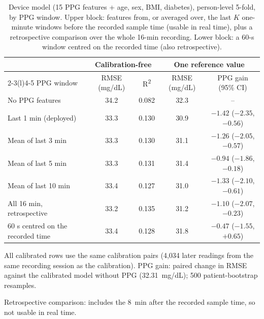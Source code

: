 \documentclass[11pt]{article}
\newcommand{\RR}{R\textsuperscript{2}}
\newcommand{\mgdl}{mg/dL}
\begin{document}
\begin{table}[!htbp]
\centering\footnotesize\setlength{\tabcolsep}{3.2pt}
\begin{threeparttable}
\caption{Device model (15 PPG features + age, sex, BMI, diabetes), person-level 5-fold, by PPG window. Upper block: features from, or averaged over, the last $K$ one-minute windows before the recorded sample time (usable in real time), plus a retrospective comparison over the whole 16-min recording. Lower block: a 60-s window centred on the recorded time (also retrospective).}
\label{tab:device}
\begin{tabular}{@{}lcccc@{}}
\toprule
& \multicolumn{2}{c}{Calibration-free} & \multicolumn{2}{c}{One reference value} \\
\cmidrule(lr){2-3}\cmidrule(l){4-5}
PPG window & RMSE (\mgdl{}) & \RR{} & RMSE (\mgdl{}) & PPG gain (95\% CI) \\
\midrule
No PPG features & 34.2 & 0.082 & 32.3 & -- \\
\rowcolor{rowgray} Last 1 min (deployed) & 33.3 & 0.130 & 30.9 & $-1.42$ ($-2.35$, $-0.56$) \\
Mean of last 3 min & 33.3 & 0.130 & 31.1 & $-1.26$ ($-2.05$, $-0.57$) \\
Mean of last 5 min & 33.3 & 0.131 & 31.4 & $-0.94$ ($-1.86$, $-0.18$) \\
Mean of last 10 min & 33.4 & 0.127 & 31.0 & $-1.33$ ($-2.10$, $-0.61$) \\
All 16 min, retrospective\tnote{a} & 33.2 & 0.135 & 31.2 & $-1.10$ ($-2.07$, $-0.23$) \\
\midrule
60 s centred on the recorded time & 33.4 & 0.128 & 31.8 & $-0.47$ ($-1.55$, $+0.65$) \\
\bottomrule
\end{tabular}
\begin{tablenotes}\footnotesize
\item All calibrated rows use the same calibration pairs (4,034 later readings from the same recording session as the calibration). PPG gain: paired change in RMSE against the calibrated model without PPG (32.31~\mgdl{}); 500 patient-bootstrap resamples.
\item[a] Retrospective comparison: includes the 8~min after the recorded sample time, so not usable in real time.
\end{tablenotes}
\end{threeparttable}
\end{table}
\end{document}

